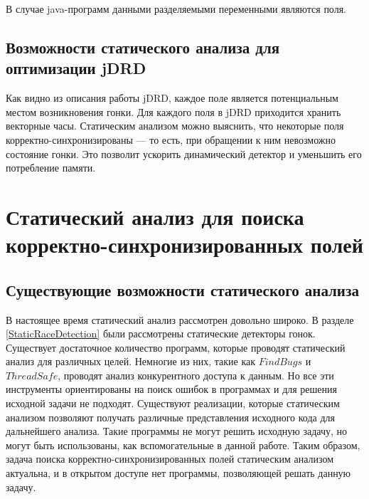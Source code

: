 В случае java-программ данными разделяемыми переменными являются поля. 


\subsection{Возможности статического анализа для оптимизации jDRD}
Как видно из описания работы jDRD, каждое поле является потенциальным местом возникновения гонки.  
Для каждого поля в jDRD приходится хранить векторные часы. Статическим анализом можно выяснить, что некоторые поля корректно-синхронизированы --- то есть, при обращении к ним невозможно состояние гонки. Это позволит ускорить динамический детектор и уменьшить его потребление памяти. 

\section{Статический анализ для поиска корректно-синхронизированных полей}

\subsection{Существующие возможности статического анализа}
В настоящее время статический анализ рассмотрен довольно широко.
В разделе \ref{StaticRaceDetection} были рассмотрены статические детекторы гонок. Существует достаточное количество программ, которые проводят статический анализ для различных целей. Немногие из них, такие как $FindBugs$\cite{FindBugs} и $ThreadSafe$, проводят анализ конкурентного доступа к данным. Но все эти инструменты ориентированы на поиск ошибок в программах и для решения исходной задачи не подходят.
Существуют реализации, которые статическим анализом позволяют получать различные представления исходного кода для дальнейшего анализа. Такие программы не могут решить исходную задачу, но могут быть использованы, как вспомогательные в данной работе. 
Таким образом, задача поиска корректно-синхронизированных полей статическим анализом актуальна, и в открытом доступе нет программы, позволяющей решать данную задачу. 
